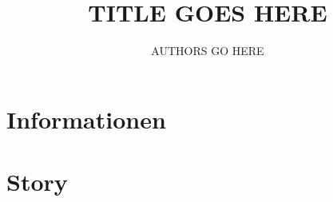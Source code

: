 \documentclass{include/protokollclass}
\title{TITLE GOES HERE}
\author{AUTHORS GO HERE}
\begin{document}
\maketitle
\tableofcontents

\chapter{Informationen}


\chapter{Story}
%
\end{document}
